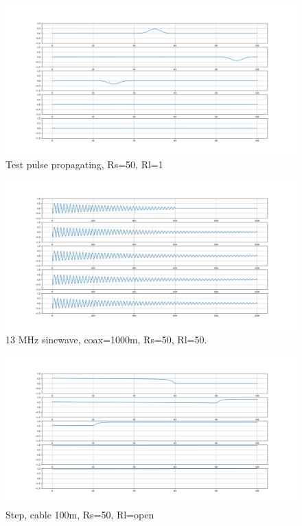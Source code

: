 \documentclass[12pt, letterpaper]{article}
\begin{document}
\begin{figure}[H]
	\centering
	\includegraphics[width=1\textwidth]{gaussianpulse.png} %
	\caption{Test pulse propagating, Rs=50, Rl=1}
\end{figure}

\begin{figure}[H]
	\centering
	\includegraphics[width=1\textwidth]{1000m.png} %
	\caption{13 MHz sinewave, coax=1000m, Rs=50, Rl=50.}
\end{figure}

\begin{figure}[H]
	\centering
	\includegraphics[width=1\textwidth]{step-1.png} %
	\caption{Step, cable 100m, Rs=50, Rl=open}
\end{figure}
\end{document}
